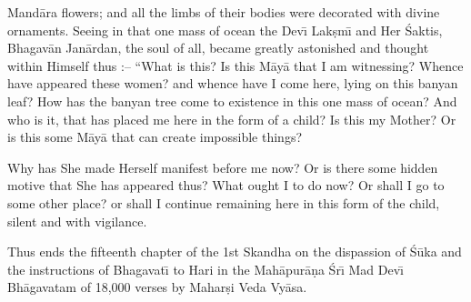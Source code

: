 Mand\=ara flowers; and all the limbs of their bodies were decorated with divine ornaments. Seeing in that one mass of ocean the Dev\={\i} Lak\d{s}m\={\i} and Her \'Saktis, Bhagav\=an Jan\=ardan, the soul of all, became greatly astonished and thought within Himself thus :-- ``What is this? Is this M\=ay\=a that I am witnessing? Whence have appeared these women? and whence have I come here, lying on this banyan leaf? How has the banyan tree come to existence in this one mass of ocean? And who is it, that has placed me here in the form of a child? Is this my Mother? Or is this some M\=ay\=a that can create impossible things?

Why has She made Herself manifest before me now? Or is there some hidden motive that She has appeared thus? What ought I to do now? Or shall I go to some other place? or shall I continue remaining here in this form of the child, silent and with vigilance.

Thus ends the fifteenth chapter of the 1st Skandha on the dispassion of \'S\=uka and the instructions of Bhagavat\={\i} to Hari in the Mah\=apur\=a\d{n}a \'Sr\={\i} Mad Dev\={\i} Bh\=agavatam of 18,000 verses by Mahar\d{s}i Veda Vy\=asa.




